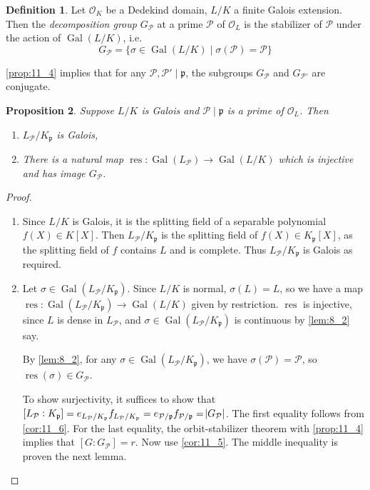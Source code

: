\documentclass[11pt]{article}
\theoremstyle{definition}
\newtheorem{definition}{Definition}[subsection]
\theoremstyle{plain}
\newtheorem{proposition}[definition]{Proposition}
\theoremstyle{remark}
\DeclareMathOperator{\Gal}{Gal}
\DeclareMathOperator{\res}{res}
\newcommand{\cO}{\mathcal{O}}
\newcommand{\cP}{\mathcal{P}}
\newcommand{\fp}{\mathfrak{p}}
\begin{document}
\begin{definition}
    Let $\cO_K$ be a Dedekind domain, $L/K$ a finite Galois extension. Then the \emph{decomposition group} $G_\cP$ at a prime $\cP$ of $\cO_L$ is the stabilizer of $\cP$ under the action of $\Gal(L/K)$, i.e.
    \begin{equation*}
        G_\cP = \{\sigma \in \Gal(L/K) \mid \sigma(\cP) = \cP\}
    \end{equation*}
\end{definition}

\autoref{prop:11_4} implies that for any $\cP, \cP' \mid \fp$, the subgroups $G_\cP$ and $G_{\cP'}$ are conjugate.

\begin{proposition}\label{prop:11_8}
    Suppose $L / K$ is Galois and $\cP \mid \fp$ is a prime of $\cO_L$. Then
    \begin{enumerate}
        \item $L_\cP / K_\fp$ is Galois,
        \item There is a natural map $\res : \Gal(L_\cP) \to \Gal(L / K)$ which is injective and has image $G_\cP$.
    \end{enumerate}
\end{proposition}
\begin{proof}\phantom{}
    \begin{enumerate}
        \item Since $L/K$ is Galois, it is the splitting field of  a separable polynomial $f(X) \in K[X]$. Then $L_\cP / K_\fp$ is the splitting field of $f(X) \in K_\fp[X]$, as the splitting field of $f$ contains $L$ and is complete. Thus $L_\cP / K_\fp$ is Galois as required.

        \item Let $\sigma \in \Gal(L_\cP / K_\fp)$. Since $L / K$ is normal, $\sigma(L) = L$, so we have a map $\res : \Gal(L_\cP / K_\fp) \to \Gal(L / K)$ given by restriction. $\res$ is injective, since $L$ is dense in $L_\cP$, and $\sigma \in \Gal(L_\cP / K_\fp)$ is continuous by \autoref{lem:8_2} say.

            By \autoref{lem:8_2}, for any $\sigma \in \Gal(L_\cP / K_\fp)$, we have $\sigma(\cP) = \cP$, so $\res(\sigma) \in G_\cP$.

            To show surjectivity, it suffices to show that $[L_\cP : K_\fp] = e_{L_\cP / K_\fp} f_{L_\cP / K_\fp} = e_{\cP / \fp} f_{\cP / \fp} = \abs{G_\cP}$. The first equality follows from \autoref{cor:11_6}. For the last equality, the orbit-stabilizer theorem with \autoref{prop:11_4} implies that $[G : G_\cP] = r$. Now use \autoref{cor:11_5}. The middle inequality is proven the next lemma. \qedhere
    \end{enumerate}
\end{proof}
\end{document}
